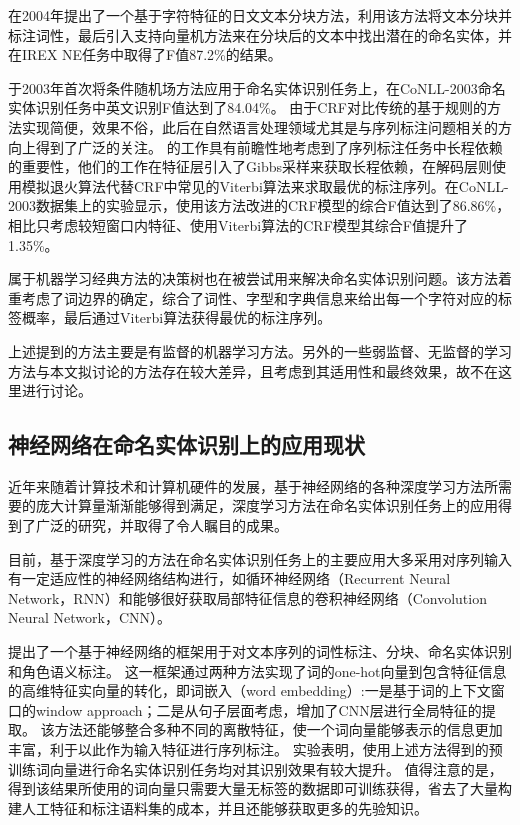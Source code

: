\citet{asahara2003japanese}在2004年提出了一个基于字符特征的日文文本分块方法，利用该方法将文本分块并标注词性，最后引入支持向量机方法来在分块后的文本中找出潜在的命名实体，并在IREX NE任务中取得了F值87.2\%的结果。

\citet{mccallum2003early}于2003年首次将条件随机场方法应用于命名实体识别任务上，在CoNLL-2003命名实体识别任务中英文识别F值达到了84.04\%。
由于CRF对比传统的基于规则的方法实现简便，效果不俗，此后在自然语言处理领域尤其是与序列标注问题相关的方向上得到了广泛的关注。
\citet{finkel2005incorporating}的工作具有前瞻性地考虑到了序列标注任务中长程依赖的重要性，他们的工作在特征层引入了Gibbs采样来获取长程依赖，在解码层则使用模拟退火算法代替CRF中常见的Viterbi算法来求取最优的标注序列。在CoNLL-2003数据集上的实验显示，使用该方法改进的CRF模型的综合F值达到了86.86\%，相比只考虑较短窗口内特征、使用Viterbi算法的CRF模型其综合F值提升了1.35\%。

属于机器学习经典方法的决策树也在被\citet{sekine1998decision}尝试用来解决命名实体识别问题。该方法着重考虑了词边界的确定，综合了词性、字型和字典信息来给出每一个字符对应的标签概率，最后通过Viterbi算法获得最优的标注序列。

上述提到的方法主要是有监督的机器学习方法。另外的一些弱监督、无监督的学习方法与本文拟讨论的方法存在较大差异，且考虑到其适用性和最终效果，故不在这里进行讨论。

\subsection{神经网络在命名实体识别上的应用现状}
近年来随着计算技术和计算机硬件的发展，基于神经网络的各种深度学习方法所需要的庞大计算量渐渐能够得到满足，深度学习方法在命名实体识别任务上的应用得到了广泛的研究，并取得了令人瞩目的成果。

目前，基于深度学习的方法在命名实体识别任务上的主要应用大多采用对序列输入有一定适应性的神经网络结构进行，如循环神经网络（Recurrent Neural Network，RNN）和能够很好获取局部特征信息的卷积神经网络（Convolution Neural Network，CNN）。

\citet{collobert2011natural}提出了一个基于神经网络的框架用于对文本序列的词性标注、分块、命名实体识别和角色语义标注。
这一框架通过两种方法实现了词的one-hot向量到包含特征信息的高维特征实向量的转化，即词嵌入（word embedding）:一是基于词的上下文窗口的window approach；二是从句子层面考虑，增加了CNN层进行全局特征的提取。
该方法还能够整合多种不同的离散特征，使一个词向量能够表示的信息更加丰富，利于以此作为输入特征进行序列标注。
实验表明，使用上述方法得到的预训练词向量进行命名实体识别任务均对其识别效果有较大提升。
值得注意的是，得到该结果所使用的词向量只需要大量无标签的数据即可训练获得，省去了大量构建人工特征和标注语料集的成本，并且还能够获取更多的先验知识。

